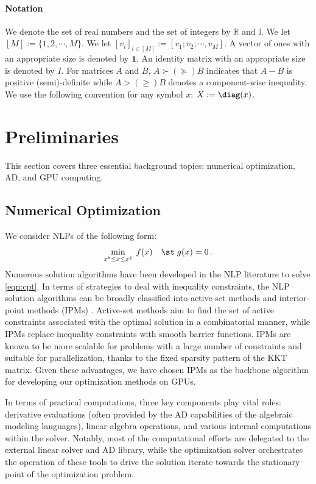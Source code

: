 \paragraph*{Notation}
We denote the set of real numbers and the set of integers by
$\mathbb{R}$ and $\mathbb{I}$. We let $[M]:=\{1,2,\cdots,M\}$. We let
$[v_i]_{i\in[M]}:=[v_1;v_2;\cdots,v_M]$.  A vector of ones with an
appropriate size is denoted by $\boldsymbol{1}$. An identity matrix
with an appropriate size is denoted by $I$. For matrices $A$ and $B$,
$A\succ(\succeq) B$ indicates that $A-B$ is positive (semi)-definite
while $A>(\geq) B$ denotes a component-wise inequality. We use the
following convention for any symbol $x$: $X:=\diag(x)$.

\section{Preliminaries}\label{sec:prelim}
This section covers three essential background topics: numerical
optimization, AD, and GPU computing.

\subsection{Numerical Optimization}\label{sec:numopt}
We consider NLPs of the following form:
\begin{equation}\label{eqn:cpt}
    \min_{x^\flat \leq x \leq x^\sharp}\;  f(x) \quad \st\;
     g(x) =0 \, .
\end{equation}
Numerous solution algorithms have been developed in the NLP
literature to solve \eqref{eqn:cpt}. In terms of strategies to deal with inequality
constraints, the NLP solution algorithms can be broadly classified
into active-set methods and interior-point methods (IPMs) \cite{nocedal2006numerical}.
Active-set methods aim to find the set of active constraints associated
with the optimal solution in a combinatorial manner, while IPMs
replace inequality constraints with smooth barrier functions.
IPMs are known to be
more scalable for problems with a large number of constraints and
suitable for parallelization, thanks to the fixed sparsity pattern of
the KKT matrix. Given these advantages, we have chosen IPMs as the
backbone algorithm for developing our optimization methods on GPUs.

In terms of practical computations, three key components play
vital roles: derivative evaluations (often provided by the AD
capabilities of the algebraic modeling languages), linear algebra
operations, and various internal computations within the
solver. Notably, most of the computational efforts are delegated to
the external linear solver and AD library, while the optimization solver
orchestrates the operation of these tools to drive the solution
iterate towards the stationary point of the optimization problem.

